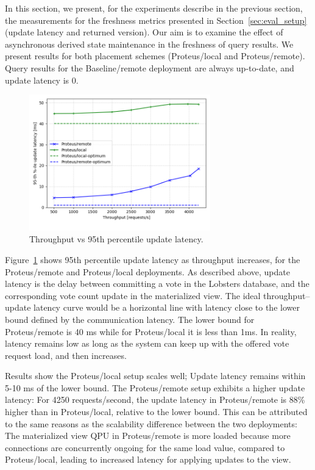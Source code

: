 In this section, we present, for the experiments describe in the previous section,
the measurements for the freshness metrics presented in Section~\ref{sec:eval_setup} (update latency and returned version).
Our aim is to examine the effect of asynchronous derived state maintenance in the freshness of query results.
We present results for both placement schemes (Proteus/local and Proteus/remote).
Query results for the Baseline/remote deployment are always up-to-date,
and update latency is 0.


\begin{figure}[H]
\centering
  \includegraphics[width=0.7\textwidth]{./figures/evaluation/fr_latency_throughput.png}
  \caption{Throughput vs 95th percentile update latency.}
  \label{fig:fr_latency_throughput}
\end{figure}

Figure~\ref{fig:fr_latency_throughput} shows 95th percentile update latency as throughput increases,
for the Proteus/remote and Proteus/local deployments.
As described above, update latency is the delay between committing a vote in the Lobsters database,
and the corresponding vote count update in the materialized view.
The ideal throughput--update latency curve would be a horizontal line with latency close to the lower bound defined by
the communication latency.
The lower bound for Proteus/remote is 40 ms while for Proteus/local it is less than 1ms.
In reality, latency remains low as long as the system can keep up with the offered vote request load,
and then increases.

Results show the Proteus/local setup scales well; Update latency remains within 5-10 ms of the lower bound.
The Proteus/remote setup exhibits a higher update latency:
For 4250 requests/second, the update latency in Proteus/remote is 88\% higher than in Proteus/local,
relative to the lower bound.
This can be attributed to the same reasons as the scalability difference between the two deployments:
The materialized view QPU in Proteus/remote is more loaded because more connections are concurrently ongoing
for the same load value, compared to Proteus/local,
leading to increased latency for applying updates to the view.

